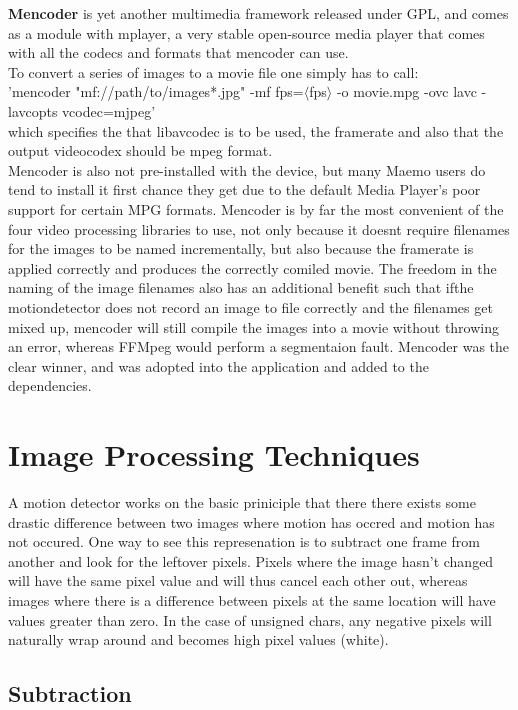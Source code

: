 \documentclass[11pt]{article} %
\begin{document}
{{\hspace{-20pt} {\bf Mencoder} is yet another multimedia framework released under GPL, and comes as a module with mplayer, a very stable open-source media player that comes with all the codecs and formats that mencoder can use.\\
To convert a series of images to a movie file one simply has to call:\\
'mencoder "mf://path/to/images*.jpg" -mf fps=\(\langle\)fps\(\rangle\) -o movie.mpg -ovc lavc -lavcopts vcodec=mjpeg'\\
which specifies the that libavcodec is to be used, the framerate and also that the output videocodex should be mpeg format.
\\Mencoder is also not pre-installed with the device, but many Maemo users do tend to install it first chance they get due to the default Media Player's poor support for certain MPG formats. Mencoder is by far the most convenient of the four video processing libraries to use, not only because it doesnt require filenames for the images to be named incrementally, but also because the framerate is applied correctly and produces the correctly comiled movie. The freedom in the naming of the image filenames also has an additional benefit such that ifthe motiondetector does not record an image to file correctly and the filenames get mixed up, mencoder will still compile the images into a movie without throwing an error, whereas FFMpeg would perform a segmentaion fault. Mencoder was the clear winner, and was adopted into the application and added to the dependencies.


\section{Image Processing Techniques}\label{proctechniques}
A motion detector works on the basic priniciple that there there exists some drastic difference between two images where motion has occred and motion has not occured. One way to see this represenation is to subtract one frame from another and look for the leftover pixels. Pixels where the image hasn't changed will have the same pixel value and will thus cancel each other out, whereas images where there is a difference between pixels at the same location will have values greater than zero. In the case of unsigned chars, any negative pixels will naturally wrap around and becomes high pixel values (white).
\pagebreak
\subsection{Subtraction}
}}
\end{document}
